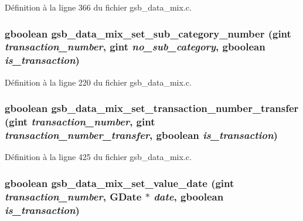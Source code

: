 Définition à la ligne 366 du fichier gsb\_\-data\_\-mix.c.

\subsubsection[{gsb\_\-data\_\-mix\_\-set\_\-sub\_\-category\_\-number}]{\setlength{\rightskip}{0pt plus 5cm}gboolean gsb\_\-data\_\-mix\_\-set\_\-sub\_\-category\_\-number (gint {\em transaction\_\-number}, \/  gint {\em no\_\-sub\_\-category}, \/  gboolean {\em is\_\-transaction})}\label{gsb__data__mix_8h_a409ba94a9f91539a976c4181048f2e32}


Définition à la ligne 220 du fichier gsb\_\-data\_\-mix.c.

\subsubsection[{gsb\_\-data\_\-mix\_\-set\_\-transaction\_\-number\_\-transfer}]{\setlength{\rightskip}{0pt plus 5cm}gboolean gsb\_\-data\_\-mix\_\-set\_\-transaction\_\-number\_\-transfer (gint {\em transaction\_\-number}, \/  gint {\em transaction\_\-number\_\-transfer}, \/  gboolean {\em is\_\-transaction})}\label{gsb__data__mix_8h_a37d924fdac56d828fe15f795bdb48229}


Définition à la ligne 425 du fichier gsb\_\-data\_\-mix.c.

\subsubsection[{gsb\_\-data\_\-mix\_\-set\_\-value\_\-date}]{\setlength{\rightskip}{0pt plus 5cm}gboolean gsb\_\-data\_\-mix\_\-set\_\-value\_\-date (gint {\em transaction\_\-number}, \/  GDate $\ast$ {\em date}, \/  gboolean {\em is\_\-transaction})}\label{gsb__data__mix_8h_acf0d9be87925bf822e6f46187703353e}


